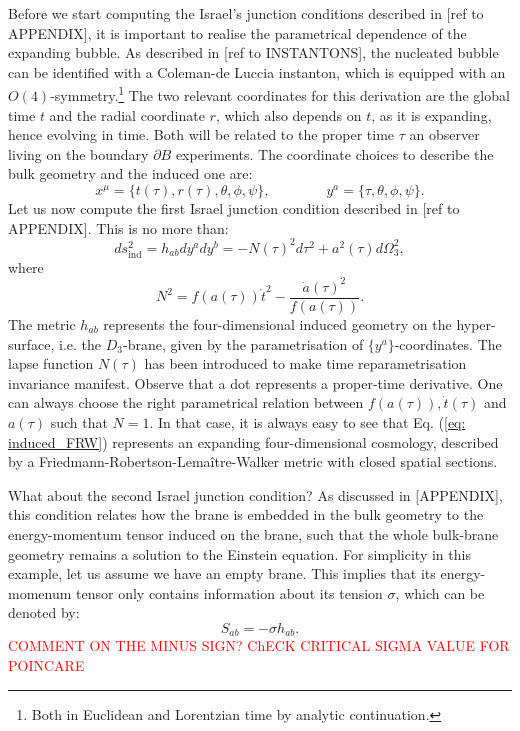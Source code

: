 \documentclass[12pt, a4paper]{article} %
\begin{document}
Before we start computing the Israel's junction conditions described in [ref to APPENDIX], it is important to realise the parametrical dependence of the expanding bubble. As described in [ref to INSTANTONS], the nucleated bubble can be identified with a Coleman-de Luccia instanton, which is equipped with an $O(4)$-symmetry.\footnote{Both in Euclidean and Lorentzian time by analytic continuation.} The two relevant coordinates for this derivation are the global time $t$ and the radial coordinate $r$, which also depends on $t$, as it is expanding, hence evolving in time. Both will be related to the proper time $\tau$ an observer living on the boundary $\partial B$ experiments. The coordinate choices to describe the bulk geometry and the induced one are:
\begin{equation}\label{eq: coordinates}
	x^{\mu} = \{t(\tau), r(\tau), \theta, \phi, \psi \}, \qquad \qquad  y^{a} = \{\tau, \theta, \phi, \psi\}.
\end{equation}
Let us now compute the first Israel junction condition described in [ref to APPENDIX]. This is no more than:
\begin{equation}\label{eq: induced_FRW}
	ds^{2}_{\text{ind}} = h_{ab} dy^{a} dy^{b} =  -N(\tau)^{2}d\tau^{2} + a^{2}(\tau) d\Omega_{3}^{2},
\end{equation}
where
\begin{equation}\label{eq: lapse_func}
	N^{2} = f(a(\tau)) \dot{t}^{2} - \frac{\dot{a}(\tau)^{2}}{f(a(\tau))}.
\end{equation}
The metric $h_{ab}$ represents the four-dimensional induced geometry on the hyper-surface, i.e. the $D_{3}$-brane, given by the parametrisation of $\{y^{a}\}$-coordinates. The lapse function $N(\tau)$ has been introduced to make time reparametrisation invariance manifest. Observe that a dot represents a proper-time derivative. One can always choose the right parametrical relation between $f(a(\tau)), \dot{t}(\tau)$ and $a(\tau)$ such that $N=1$. In that case, it is always easy to see that Eq. (\ref{eq: induced_FRW}) represents an expanding four-dimensional cosmology, described by a Friedmann-Robertson-Lemaître-Walker metric with closed spatial sections. 

What about the second Israel junction condition? As discussed in [APPENDIX], this condition relates how the brane is embedded in the bulk geometry to the energy-momentum tensor induced on the brane, such that the whole bulk-brane geometry remains a solution to the Einstein equation. For simplicity in this example, let us assume we have an empty brane. This implies that its energy-momenum tensor only contains information about its tension $\sigma$, which can be denoted by:
\begin{equation}\label{eq: simple_second_junc}
	S_{ab} = - \sigma h_{ab}.
\end{equation}
\textcolor{red}{COMMENT ON THE MINUS SIGN? ChECK CRITICAL SIGMA VALUE FOR POINCARE}
\end{document}
